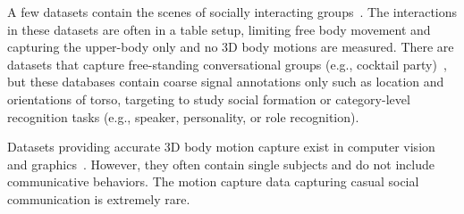 A few datasets contain the scenes of socially interacting groups~\cite{mccowan2005ami, zancanaro2006automatic, lepri2012connecting, rehg2013decoding}. The interactions in these datasets are often in a table setup, limiting free body movement and capturing the upper-body only and no 3D body motions are measured. There are datasets that capture free-standing conversational groups (e.g., cocktail party)~\cite{Zen-10, Cristani-11, SALSA-15, farenzena2009social}, but these databases contain coarse signal annotations only such as location and orientations of torso, targeting to study social formation or category-level recognition tasks (e.g., speaker, personality, or role recognition).

Datasets providing accurate 3D body motion capture exist in computer vision and graphics~\cite{gross2001cmu, h36m_pami, sigal2010humaneva}.  However, they often contain single subjects and do not include communicative behaviors. The motion capture data capturing casual social communication is extremely rare. 

%





